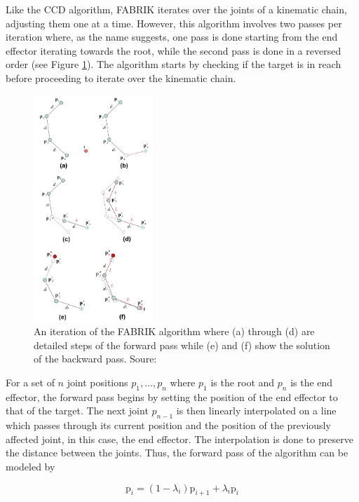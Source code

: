 Like the CCD algorithm, FABRIK iterates over the joints of a kinematic chain,
adjusting them one at a time. However, this algorithm involves two passes per
iteration where, as the name suggests, one pass is done starting from the end
effector iterating towards the root, while the second pass is done in a reversed
order (see Figure \ref{fig:fabrik}). The algorithm starts by checking if the target is in reach before
proceeding to iterate over the kinematic chain. 

\begin{figure}[!h]
    \centering
    \captionsetup{justification=centering}
    \includegraphics[width=0.4\textwidth]{grafika/fabrik_iteration.png}
    \caption{An iteration of the FABRIK algorithm where (a) through (d) are
    detailed steps of the forward pass while (e) and (f) show the solution of
    the backward pass. Soure: \cite{Aristidou2011}}
    \label{fig:fabrik}
\end{figure}

For a set of \(n\) joint positions \(p_1, \dots, p_n\) where \(p_1\) is the root
and \(p_n\) is the end effector, the forward pass begins by setting the position
of the end effector to that of the target. The next joint \(p_{n-1}\) is
then linearly interpolated on a line which passes through its current position
and the position of the previously affected joint, in this case, the end
effector. The interpolation is done to preserve the distance between the joints.
Thus, the forward pass of the algorithm can be modeled by 

\begin{equation}
    \mbox{p}_i = (1 - \lambda_i)\mbox{p}_{i+1} + \lambda_i \mbox{p}_i
\end{equation}

